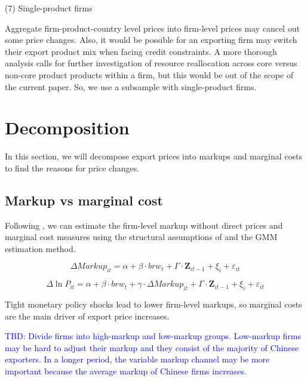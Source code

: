 \documentclass[12pt]{article}
\begin{document}
(7) Single-product firms

Aggregate firm-product-country level prices into firm-level prices may cancel out some price changes. Also, it would be possible for an exporting firm may switch their export product mix when facing credit constraints. A more thorough analysis calls for further investigation of resource reallocation across core versus non-core product products within a firm, but this would be out of the scope of the current paper. So, we use a subsample with single-product firms.


\section{Decomposition}

In this section, we will decompose export prices into markups and marginal costs to find the reasons for price changes.

\subsection{Markup vs marginal cost}

Following \cite{}, we can estimate the firm-level markup without direct prices and marginal cost measures using the structural assumptions of \cite{dlw2012} and the GMM estimation method.

\begin{equation}
    \Delta Markup_{it} = \alpha +\beta \cdot brw_{t}+ \Gamma \cdot \textbf{Z}_{it-1}+\xi_{i}+\varepsilon_{it} 
\end{equation}

\begin{equation}
    \Delta \ln P_{it} = \alpha+\beta \cdot brw_{t}+ \gamma \cdot \Delta Markup_{it}+ \Gamma \cdot \textbf{Z}_{it-1}+\xi_{i}+\varepsilon_{i t} 
\end{equation}

Tight monetary policy shocks lead to lower firm-level markups, so marginal costs are the main driver of export price increases.


\textcolor{blue}{TBD: Divide firms into high-markup and low-markup groups. Low-markup firms may be hard to adjust their markup and they consist of the majority of Chinese exporters. In a longer period, the variable markup channel may be more important because the average markup of Chinese firms increases.} 
\end{document}
